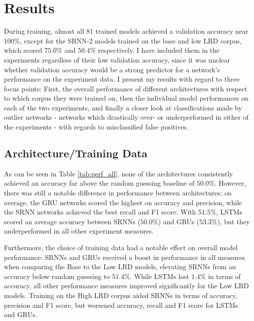 \section{Results}\label{ch:results}
During training, almost all $81$ trained models achieved a validation accuracy near $100\%$, except for the SRNN-2 models trained on the base and low LRD corpus, which scored $75.0\%$ and $50.4\%$ respectively. I have included them in the experiments regardless of their low validation accuracy, since it was unclear whether validation accuracy would be a strong predictor for a network's performance on the experiment data. I present my results with regard to three focus points: First, the overall performance of different architectures with respect to which corpus they were trained on, then the individual model performances on each of the two experiments, and finally a closer look at classifications made by outlier networks - networks which drastically over- or underperformed in either of the experiments - with regards to misclassified false positives.

\subsection{Architecture/Training Data}\label{results_ATD}

As can be seen in Table \ref{tab:perf_all}, none of the architectures consistently achieved an accuracy far above the random guessing baseline of $50.0\%$. However, there was still a notable difference in performance between architectures: on average, the GRU networks scored the highest on accuracy and precision, while the SRNN networks achieved the best recall and F1 score. With $51.5\%$, LSTMs scored an average accuracy between SRNNs ($50.0\%$) and GRUs ($53.3\%$), but they underperformed in all other experiment measures.

Furthermore, the choice of training data had a notable effect on overall model performance: SRNNs and GRUs received a boost in performance in all measures when comparing the Base to the Low LRD models, elevating SRNNs from an accuracy below random guessing to $51.4\%$. While LSTMs lost $1.4\%$ in terms of accuracy, all other performance measures improved significantly for the Low LRD models. Training on the High LRD corpus aided SRNNs in terms of accuracy, precision and F1 score, but worsened accuracy, recall and F1 score for LSTMs and GRUs.

